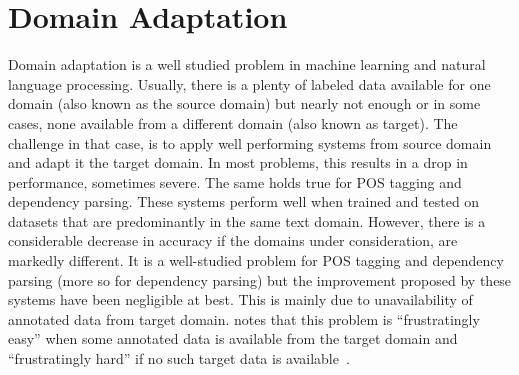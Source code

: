 \chapter{Domain Adaptation}

Domain adaptation is a well studied problem in machine learning and natural language processing. Usually, there is a plenty of labeled data available for one domain (also known as the source domain) but nearly not enough or in some cases, none available from a different domain (also known as target). The challenge in that case, is to apply well performing systems from source domain and adapt it the target domain. In most problems, this results in a drop in performance, sometimes severe. The same holds true for POS tagging and dependency parsing. These systems perform well when trained and tested on datasets that are predominantly in the same text domain. However, there is a considerable decrease in accuracy if the domains under consideration, are markedly different. It is a well-studied problem for POS tagging and dependency parsing (more so for dependency parsing) but the improvement proposed by these systems have been negligible at best. This is mainly due to unavailability of annotated data from target domain. \cite{daume:07} notes that this problem is ``frustratingly easy'' when some annotated data  is available from the target domain  and ``frustratingly hard'' if no such target data is available~\citep{dredze:blitzer:ea:07}. 

